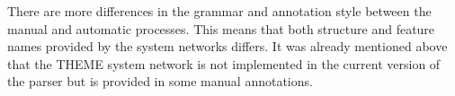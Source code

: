             
            

    There are more differences in the grammar and annotation style between the manual and automatic processes. This means that both structure and feature names provided by the system networks differs. It was already mentioned above that the THEME system network is not implemented in the current version of the parser but is provided in some manual annotations. 


